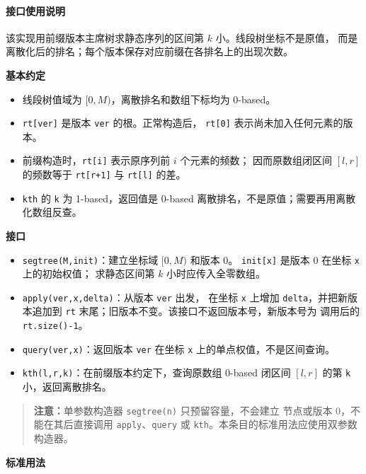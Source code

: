 \paragraph*{接口使用说明}

该实现用前缀版本主席树求静态序列的区间第 $k$ 小。线段树坐标不是原值，
而是离散化后的排名；每个版本保存对应前缀在各排名上的出现次数。

\textbf{基本约定}

\begin{itemize}
  \item 线段树值域为 $[0,M)$，离散排名和数组下标均为 0-based。
  \item \texttt{rt[ver]} 是版本 \texttt{ver} 的根。正常构造后，
        \texttt{rt[0]} 表示尚未加入任何元素的版本。
  \item 前缀构造时，\texttt{rt[i]} 表示原序列前 $i$ 个元素的频数；
        因而原数组闭区间 $[l,r]$ 的频数等于
        \texttt{rt[r+1]} 与 \texttt{rt[l]} 的差。
  \item \texttt{kth} 的 \texttt{k} 为 1-based，返回值是 0-based
        离散排名，不是原值；需要再用离散化数组反查。
\end{itemize}

\textbf{接口}

\begin{itemize}
  \item \texttt{segtree(M,init)}：建立坐标域 $[0,M)$ 和版本 0。
        \texttt{init[x]} 是版本 0 在坐标 \texttt{x} 上的初始权值；
        求静态区间第 $k$ 小时应传入全零数组。
  \item \texttt{apply(ver,x,delta)}：从版本 \texttt{ver} 出发，
        在坐标 \texttt{x} 上增加 \texttt{delta}，并把新版本追加到
        \texttt{rt} 末尾；旧版本不变。该接口不返回版本号，新版本号为
        调用后的 \texttt{rt.size()-1}。
  \item \texttt{query(ver,x)}：返回版本 \texttt{ver} 在坐标
        \texttt{x} 上的单点权值，不是区间查询。
  \item \texttt{kth(l,r,k)}：在前缀版本约定下，查询原数组 0-based
        闭区间 $[l,r]$ 的第 \texttt{k} 小，返回离散排名。
\end{itemize}

\begin{quote}
\textbf{注意：}单参数构造器 \texttt{segtree(n)} 只预留容量，不会建立
节点或版本 0，不能在其后直接调用 \texttt{apply}、\texttt{query} 或
\texttt{kth}。本条目的标准用法应使用双参数构造器。
\end{quote}

\textbf{标准用法}

